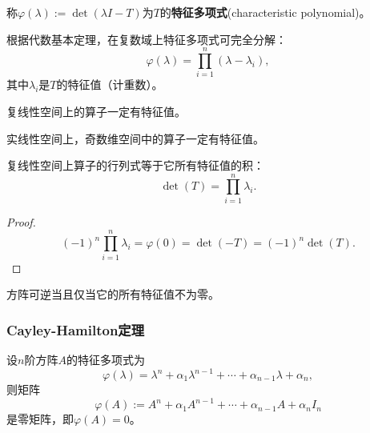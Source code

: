 \begin{definition}[特征多项式]
    称$\varphi(\lambda) := \det(\lambda I - T)$为$T$的\textbf{特征多项式}(characteristic polynomial)。
\end{definition}

根据代数基本定理，在复数域上特征多项式可完全分解：
\begin{equation}
    \varphi(\lambda) = \prod_{i=1}^{n}(\lambda - \lambda_i),
\end{equation}
其中$\lambda_i$是$T$的特征值（计重数）。

\begin{theorem}
    复线性空间上的算子一定有特征值。

    实线性空间上，奇数维空间中的算子一定有特征值。
\end{theorem}

\begin{theorem}
    复线性空间上算子的行列式等于它所有特征值的积：
    \begin{equation}
        \det(T) = \prod_{i=1}^{n}\lambda_i.
    \end{equation}
\end{theorem}

\begin{proof}
    \begin{equation}
        (-1)^n\prod_{i=1}^{n}\lambda_i = \varphi(0) = \det(-T) = (-1)^n\det(T).
    \end{equation}
\end{proof}

\begin{corollary}
    方阵可逆当且仅当它的所有特征值不为零。
\end{corollary}

\subsubsection{Cayley-Hamilton定理}

\begin{theorem}
    设$n$阶方阵$A$的特征多项式为
    \begin{equation}
        \varphi(\lambda) = \lambda^n + \alpha_1\lambda^{n-1} + \cdots + \alpha_{n-1}\lambda + \alpha_n,
    \end{equation}
    则矩阵
    \begin{equation}
        \varphi(A) := A^n + \alpha_1 A^{n-1} + \cdots + \alpha_{n-1}A + \alpha_n I_n
    \end{equation}
    是零矩阵，即$\varphi(A) = 0$。
\end{theorem}

